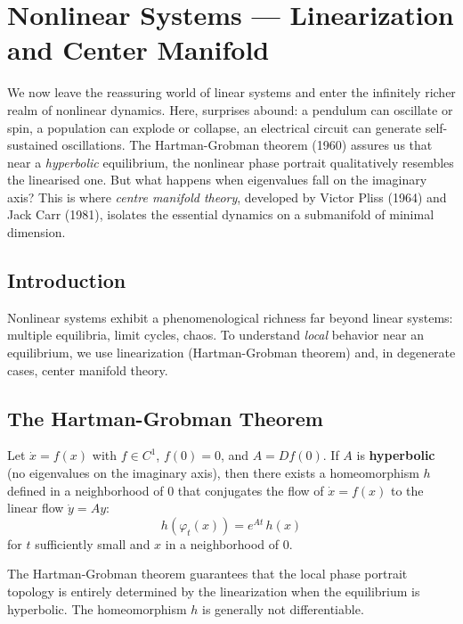 \chapter{Nonlinear Systems --- Linearization and Center Manifold}
\label{ch:nonlinear}

We now leave the reassuring world of linear systems and enter the infinitely richer realm of nonlinear dynamics. Here, surprises abound: a pendulum can oscillate or spin, a population can explode or collapse, an electrical circuit can generate self-sustained oscillations. The Hartman-Grobman theorem (1960) assures us that near a \emph{hyperbolic} equilibrium, the nonlinear phase portrait qualitatively resembles the linearised one. But what happens when eigenvalues fall on the imaginary axis? This is where \emph{centre manifold theory}, developed by Victor Pliss (1964) and Jack Carr (1981), isolates the essential dynamics on a submanifold of minimal dimension.

\section{Introduction}

Nonlinear systems exhibit a phenomenological richness far beyond linear
systems: multiple equilibria, limit cycles, chaos. To understand
\emph{local} behavior near an equilibrium, we use linearization
(Hartman-Grobman theorem) and, in degenerate cases, center manifold theory.

\section{The Hartman-Grobman Theorem}

\begin{theorem}
\label{thm:hartman-grobman}
Let $\dot{x} = f(x)$ with $f \in C^1$, $f(0) = 0$, and $A = Df(0)$.
If $A$ is \textbf{hyperbolic} (no eigenvalues on the imaginary axis), then
there exists a homeomorphism $h$ defined in a neighborhood of $0$ that
conjugates the flow of $\dot{x} = f(x)$ to the linear flow $\dot{y} = Ay$:
\[
    h(\varphi_t(x)) = e^{At}\, h(x)
\]
for $t$ sufficiently small and $x$ in a neighborhood of $0$.
\end{theorem}

\begin{remark}
The Hartman-Grobman theorem guarantees that the local phase portrait topology
is entirely determined by the linearization when the equilibrium is
hyperbolic. The homeomorphism $h$ is generally not differentiable.
\end{remark}

